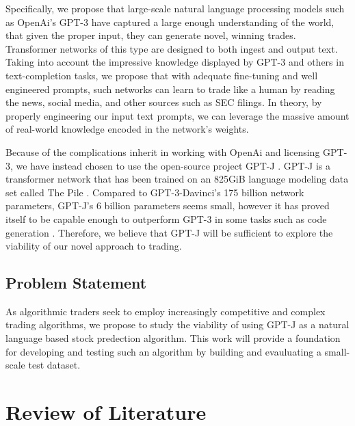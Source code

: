 \documentclass[conference]{IEEEtran}
\begin{document}
Specifically, we propose that large-scale natural language processing models such as OpenAi's GPT-3 \cite{Brown2020} have captured a large enough understanding of the world, that given the proper input, they can generate novel, winning trades. Transformer networks of this type are designed to both ingest and output text. Taking into account the impressive knowledge displayed by GPT-3 and others in text-completion tasks, we propose that with adequate fine-tuning and well engineered prompts, such networks can learn to trade like a human by reading the news, social media, and other sources such as SEC filings. In theory, by properly engineering our input text prompts, we can leverage the massive amount of real-world knowledge encoded in the network's weights.

Because of the complications inherit in working with OpenAi and licensing GPT-3, we have instead chosen to use the open-source project GPT-J \cite{mesh-transformer-jax}. GPT-J is a transformer network \cite{Vaswani2017} that has been trained on an 825GiB language modeling data set called The Pile \cite{Gao2021}. Compared to GPT-3-Davinci's 175 billion network parameters, GPT-J's 6 billion parameters seems small, however it has proved itself to be capable enough to outperform GPT-3 in some tasks such as code generation \cite{forefront}. Therefore, we believe that GPT-J will be sufficient to explore the viability of our novel approach to trading.

\subsection{Problem Statement}
As algorithmic traders seek to employ increasingly competitive and complex trading algorithms, we propose to study the viability of using GPT-J as a natural language based stock predection algorithm. This work will provide a foundation for developing and testing such an algorithm by building and evauluating a small-scale test dataset. 

\section{Review of Literature}
\end{document}
